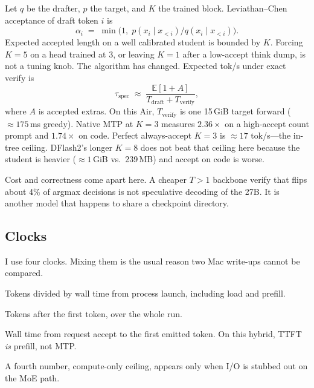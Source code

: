 Let $q$ be the drafter, $p$ the target, and $K$ the trained block. Leviathan--Chen acceptance of draft token $i$ is
\begin{equation}
  \alpha_i \;=\; \min\bigl(1,\; p(x_i\mid x_{<i})/q(x_i\mid x_{<i})\bigr).
\end{equation}
Expected accepted length on a well calibrated student is bounded by $K$. Forcing $K{=}5$ on a head trained at 3, or leaving $K{=}1$ after a low-accept think dump, is not a tuning knob. The algorithm has changed. Expected tok/s under exact verify is
\begin{equation}
  \tau_{\mathrm{spec}} \;\approx\; \frac{\mathbb{E}[1+A]}{T_{\mathrm{draft}}+T_{\mathrm{verify}}},
\end{equation}
where $A$ is accepted extras. On this Air, $T_{\mathrm{verify}}$ is one 15\,GiB target forward ($\approx 175$\,ms greedy). Native MTP at $K{=}3$ measures $2.36\times$ on a high-accept count prompt and $1.74\times$ on code. Perfect always-accept $K{=}3$ is $\approx 17$ tok/s---the in-tree ceiling. DFlash2's longer $K{=}8$ does not beat that ceiling here because the student is heavier ($\approx 1$\,GiB vs.\ 239\,MB) and accept on code is worse.

Cost and correctness come apart here. A cheaper $T{>}1$ backbone verify that flips about 4\% of argmax decisions is not speculative decoding of the 27B. It is another model that happens to share a checkpoint directory.

\subsection{Clocks}

I use four clocks. Mixing them is the usual reason two Mac write-ups cannot be compared.

\begin{definition}
Tokens divided by wall time from process launch, including load and prefill.
\end{definition}
\begin{definition}
Tokens after the first token, over the whole run.
\end{definition}
\begin{definition}
Wall time from request accept to the first emitted token. On this hybrid, TTFT \emph{is} prefill, not MTP.
\end{definition}

A fourth number, compute-only ceiling, appears only when I/O is stubbed out on the MoE path.

